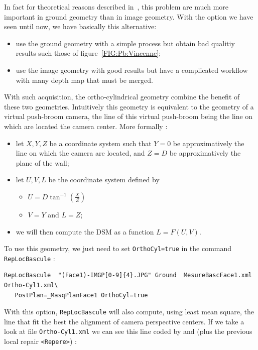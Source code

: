 In fact for theoretical reasons described in~\cite{Penard},
this problem are  much more important in ground geometry than in image geometry.
With the option we have seen until now, we have basically this alternative:

\begin{itemize}
   \item  use the ground geometry with a simple process but obtain bad qualitiy results such those of 
          figure~\ref{FIG:Pb:Vincenne};

   \item  use the image geometry with  good results but have a complicated workflow with many depth map
          that must be merged.
\end{itemize}


With such acquisition, the ortho-cylindrical geometry combine the benefit of these
two geometries. Intuitively this geometry is equivalent to the geometry of a virtual push-broom
camera, the line of this virtual push-broom being the line on which are located the 
camera center. More formally :


\begin{itemize}
   \item  let  $X,Y,Z$ be a coordinate system such that $Y=0$ be approximatively the line on which the camera
          are located, and $Z=D$ be approximatively the plane of the wall;

   \item  let  $U,V,L$ be the coordinate system defined by
\begin{itemize}
    \item  $U= D \tan^{-1} (\frac{X}{Z})$
    \item  $V=Y$ and $L=Z$;
\end{itemize}
   \item   we  will then compute the DSM as a function $L= F(U,V)$.
\end{itemize}

To use this geometry, we just need to set {\tt OrthoCyl=true} in the command {\tt RepLocBascule} :

\begin{verbatim}
RepLocBascule  "(Face1)-IMGP[0-9]{4}.JPG" Ground  MesureBascFace1.xml Ortho-Cyl1.xml\
   PostPlan=_MasqPlanFace1 OrthoCyl=true
\end{verbatim}

With this option, {\tt RepLocBascule} will also compute, using least mean square,
the line that fit the best the alignment of camera perspective centers. If we take 
a look at file {\tt Ortho-Cyl1.xml} we can see  this line coded by {\tt <P0>}
and {\tt <P1>}  (plus the previous local repair  {\tt <Repere>}) :

